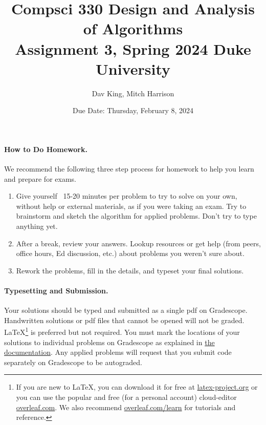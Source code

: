 \documentclass[11pt]{article}
\title{\vspace{-0.5in}Compsci 330 Design and Analysis of Algorithms \\Assignment 3, Spring 2024 Duke University}
\author{Dav King, Mitch Harrison}
\date{Due Date: Thursday, February 8, 2024}
\begin{document}
\maketitle



\paragraph{How to Do Homework.} We recommend the following three step process for homework to help you learn and prepare for exams.
\begin{enumerate}
	\item Give yourself ~15-20 minutes per problem to try to solve on your own, without help or external materials, as if you were taking an exam. Try to brainstorm and sketch the algorithm for applied problems. Don't try to type anything yet.
	\item After a break, review your answers. Lookup resources or get help (from peers, office hours, Ed discussion, etc.) about problems you weren't sure about.
	\item Rework the problems, fill in the details, and typeset your final solutions.
\end{enumerate}

\paragraph{Typesetting and Submission.} Your solutions should be typed and submitted as a single pdf on Gradescope. Handwritten solutions or pdf files that cannot be opened will not be graded. \LaTeX \footnote{If you are new to \LaTeX, you can download it for free at \href{https://www.latex-project.org}{latex-project.org} or you can use the popular and free (for a personal account) cloud-editor \href{https://www.overleaf.com}{overleaf.com}. We also recommend \href{https://www.overleaf.com/learn}{overleaf.com/learn} for tutorials and reference.} is preferred but not required. %
You must mark the locations of your solutions to individual problems on Gradescope as explained in \href{https://help.gradescope.com/article/ccbpppziu9-student-submit-work#submitting_a_pdf}{the documentation}. Any applied problems will request that you submit code separately on Gradescope to be autograded. 
\end{document}
